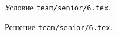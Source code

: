 \problem
Условие \texttt{team/senior/6.tex}.

\solution Решение \texttt{team/senior/6.tex}.
\endproblem
